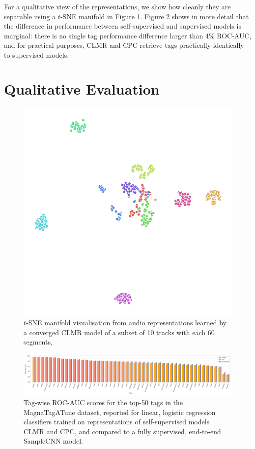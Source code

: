 \documentclass{report}
\begin{document}
For a qualitative view of the representations, we show how cleanly they are  separable using a $t$-SNE manifold in Figure \ref{fig:tsne_manifold}. Figure \ref{fig:tag_scores} shows in more detail that the difference in performance between self-supervised and supervised models is marginal: there is no single tag performance difference larger than 4\% ROC-AUC, and for practical purposes, CLMR and CPC retrieve tags practically identically to supervised models.


\section{Qualitative Evaluation}

\begin{figure}[t]
    \centering
    \includegraphics[width=0.75\columnwidth]{figs/tsne-clmr.png}
    \caption{$t$-SNE manifold visualisation from audio representations learned by a converged CLMR model of a subset of 10 tracks with each 60 segments, }
    \label{fig:tsne_manifold}
\end{figure}

\begin{figure}[t]
    \centering
    \includegraphics[width=\textwidth]{figs/tag_retrieval.png}
    \caption{Tag-wise ROC-AUC scores for the top-50 tags in the MagnaTagATune dataset, reported for linear, logistic regression classifiers trained on representations of self-supervised models CLMR and CPC, and compared to a fully supervised, end-to-end SampleCNN model.}
    \label{fig:tag_scores}
\end{figure}
\end{document}
